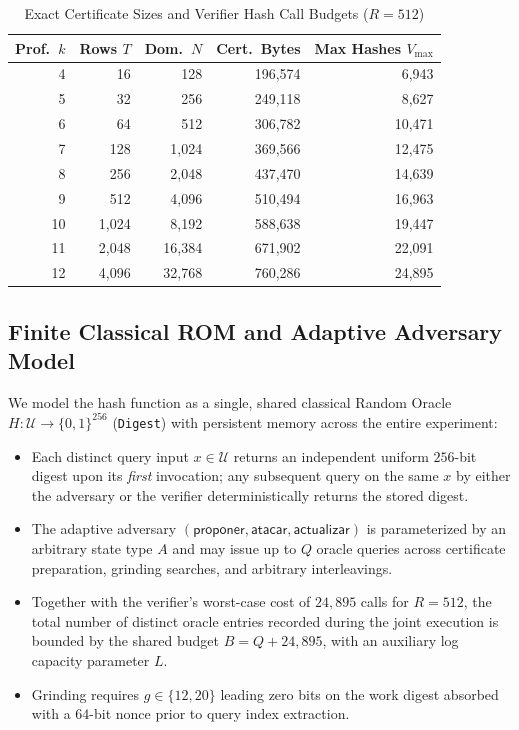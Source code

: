 \documentclass[conference]{IEEEtran}
\theoremstyle{definition}
\begin{document}
\begin{table}[t]
\centering
\caption{Exact Certificate Sizes and Verifier Hash Call Budgets ($R = 512$)}
\label{tab:profiles}
\scriptsize
\setlength{\tabcolsep}{3pt}
\begin{tabular}{@{}rrrrr@{}}
\toprule
\textbf{Prof.\ $k$} & \textbf{Rows $T$} & \textbf{Dom.\ $N$} & \textbf{Cert.\ Bytes} & \textbf{Max Hashes $V_{\max}$} \\
\midrule
4  & 16   & 128    & 196,574 & 6,943  \\
5  & 32   & 256    & 249,118 & 8,627  \\
6  & 64   & 512    & 306,782 & 10,471 \\
7  & 128  & 1,024  & 369,566 & 12,475 \\
8  & 256  & 2,048  & 437,470 & 14,639 \\
9  & 512  & 4,096  & 510,494 & 16,963 \\
10 & 1,024 & 8,192  & 588,638 & 19,447 \\
11 & 2,048 & 16,384 & 671,902 & 22,091 \\
12 & 4,096 & 32,768 & 760,286 & 24,895 \\
\bottomrule
\end{tabular}
\end{table}

\subsection{Finite Classical ROM and Adaptive Adversary Model}
We model the hash function as a single, shared classical Random Oracle $H : \mathcal{U} \to \{0,1\}^{256}$ (\texttt{Digest}) with persistent memory across the entire experiment:
\begin{itemize}
    \item Each distinct query input $x \in \mathcal{U}$ returns an independent uniform $256$-bit digest upon its \emph{first} invocation; any subsequent query on the same $x$ by either the adversary or the verifier deterministically returns the stored digest.
    \item The adaptive adversary $(\mathsf{proponer}, \mathsf{atacar}, \mathsf{actualizar})$ is parameterized by an arbitrary state type $A$ and may issue up to $Q$ oracle queries across certificate preparation, grinding searches, and arbitrary interleavings.
    \item Together with the verifier's worst-case cost of $24{,}895$ calls for $R = 512$, the total number of distinct oracle entries recorded during the joint execution is bounded by the shared budget $B = Q + 24{,}895$, with an auxiliary log capacity parameter $L$.
    \item Grinding requires $g \in \{12, 20\}$ leading zero bits on the work digest absorbed with a $64$-bit nonce prior to query index extraction.
\end{itemize}
\end{document}
